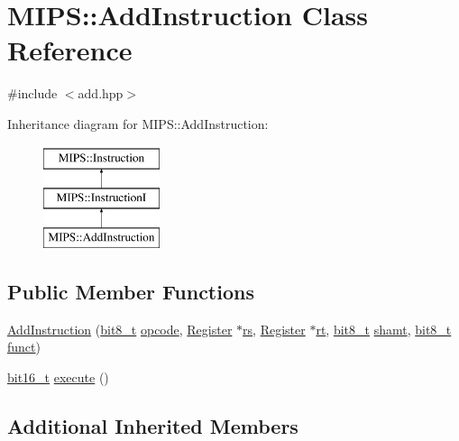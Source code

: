 \hypertarget{classMIPS_1_1AddInstruction}{}\section{M\+I\+PS\+:\+:Add\+Instruction Class Reference}
\label{classMIPS_1_1AddInstruction}


{\ttfamily \#include $<$add.\+hpp$>$}

Inheritance diagram for M\+I\+PS\+:\+:Add\+Instruction\+:\begin{figure}[H]
\begin{center}
\leavevmode
\includegraphics[height=3.000000cm]{classMIPS_1_1AddInstruction}
\end{center}
\end{figure}
\subsection*{Public Member Functions}
\begin{DoxyCompactItemize}
\item 
\hyperlink{classMIPS_1_1AddInstruction_a20874c9a6f6e0e5b5a1df2aa2d321c73}{Add\+Instruction} (\hyperlink{core_8hpp_a6074bae122ae7b527864eec42c728c3c}{bit8\+\_\+t} \hyperlink{classMIPS_1_1Instruction_a45cc6808b5dde8a5d41067d148b55476}{opcode}, \hyperlink{classMIPS_1_1Register}{Register} $\ast$\hyperlink{classMIPS_1_1InstructionI_a2be191d5b3dce505e2e626ec02eb4d62}{rs}, \hyperlink{classMIPS_1_1Register}{Register} $\ast$\hyperlink{classMIPS_1_1InstructionI_add1db07a5c954f35271de8c8a5737487}{rt}, \hyperlink{core_8hpp_a6074bae122ae7b527864eec42c728c3c}{bit8\+\_\+t} \hyperlink{classMIPS_1_1InstructionI_aa9b6da37c374c2ec8d96448d341e5e7d}{shamt}, \hyperlink{core_8hpp_a6074bae122ae7b527864eec42c728c3c}{bit8\+\_\+t} \hyperlink{classMIPS_1_1InstructionI_a5c6efcbbd233a7447c1fe24ea0a1e558}{funct})
\item 
\hyperlink{core_8hpp_adc265a970bc35995b5879784bbb3f1b7}{bit16\+\_\+t} \hyperlink{classMIPS_1_1AddInstruction_aa699dc00fdcd4250944f8afaa2fa89eb}{execute} ()
\end{DoxyCompactItemize}
\subsection*{Additional Inherited Members}


